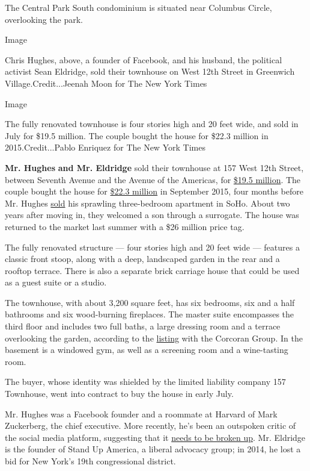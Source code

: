 The Central Park South condominium is situated near Columbus Circle,
overlooking the park.

Image

Chris Hughes, above, a founder of Facebook, and his husband, the
political activist Sean Eldridge, sold their townhouse on West 12th
Street in Greenwich Village.Credit...Jeenah Moon for The New York Times

Image

The fully renovated townhouse is four stories high and 20 feet wide, and
sold in July for \$19.5 million. The couple bought the house for \$22.3
million in 2015.Credit...Pablo Enriquez for The New York Times

\textbf{Mr. Hughes} \textbf{and Mr. Eldridge} sold their townhouse at
157 West 12th Street, between Seventh Avenue and the Avenue of the
Americas, for
\href{https://a836-acris.nyc.gov/DS/DocumentSearch/DocumentDetail?doc_id=2020071000364001}{\$19.5
million}. The couple bought the house for
\href{https://www.nytimes.com/2015/09/13/realestate/greenwich-village-townhouse-for-22-million.html}{\$22.3
million} in September 2015, four months before Mr. Hughes
\href{https://a836-acris.nyc.gov/DS/DocumentSearch/DocumentDetail?doc_id=2016010500865001}{sold}
his sprawling three-bedroom apartment in SoHo. About two years after
moving in, they welcomed a son through a surrogate. The house was
returned to the market last summer with a \$26 million price tag.

The fully renovated structure --- four stories high and 20 feet wide ---
features a classic front stoop, along with a deep, landscaped garden in
the rear and a rooftop terrace. There is also a separate brick carriage
house that could be used as a guest suite or a studio.

The townhouse, with about 3,200 square feet, has six bedrooms, six and a
half bathrooms and six wood-burning fireplaces. The master suite
encompasses the third floor and includes two full baths, a large
dressing room and a terrace overlooking the garden, according to the
\href{https://www.corcoran.com/nyc-real-estate/for-sale/greenwich-village/157-west-12-th-street/5873971}{listing}
with the Corcoran Group. In the basement is a windowed gym, as well as a
screening room and a wine-tasting room.

The buyer, whose identity was shielded by the limited liability company
157 Townhouse, went into contract to buy the house in early July.

Mr. Hughes was a Facebook founder and a roommate at Harvard of Mark
Zuckerberg, the chief executive. More recently, he's been an outspoken
critic of the social media platform, suggesting that it
\href{https://www.nytimes.com/2019/05/09/opinion/sunday/chris-hughes-facebook-zuckerberg.html}{needs
to be broken up}. Mr. Eldridge is the founder of Stand Up America, a
liberal advocacy group; in 2014, he lost a bid for New York's 19th
congressional district.

